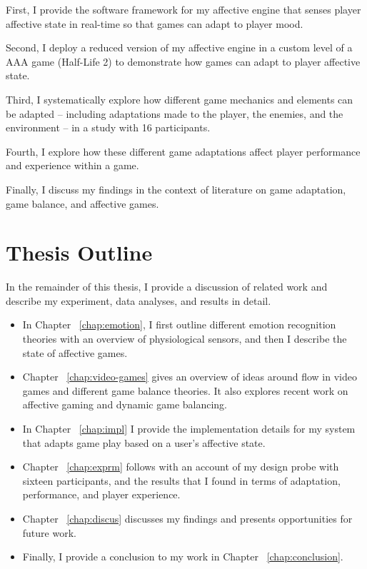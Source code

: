 First, I provide the software framework for my affective engine that senses player affective state in real-time so that games can adapt to player mood.

Second, I deploy a reduced version of my affective engine in a custom level of a AAA game (Half-Life 2) to demonstrate how games can adapt to player affective state.

Third, I systematically explore how different game mechanics and elements can be adapted – including adaptations made to the player, the enemies, and the environment – in a study with 16 participants.

Fourth, I explore how these different game adaptations affect player performance and experience within a game.

Finally, I discuss my findings in the context of literature on game adaptation, game balance, and affective games.


\section{Thesis Outline}
In the remainder of this thesis, I provide a discussion of related work and describe my experiment, data analyses, and results in detail.

\begin{itemize}
\item In Chapter ~\ref{chap:emotion}, I first outline different emotion recognition theories with an overview of physiological sensors, and then I describe the state of affective games.
\item Chapter ~\ref{chap:video-games} gives an overview of ideas around flow in video games and different game balance theories. It also explores recent work on affective gaming and dynamic game balancing.
\item In Chapter ~\ref{chap:impl} I provide the implementation details for my system that adapts game play based on a user’s affective state.
\item Chapter ~\ref{chap:exprm} follows with an account of my design probe with sixteen participants, and the results that I found in terms of adaptation, performance, and player experience.
\item Chapter ~\ref{chap:discus} discusses my findings and presents opportunities for future work.
\item Finally, I provide a conclusion to my work in Chapter ~\ref{chap:conclusion}.
\end{itemize}
